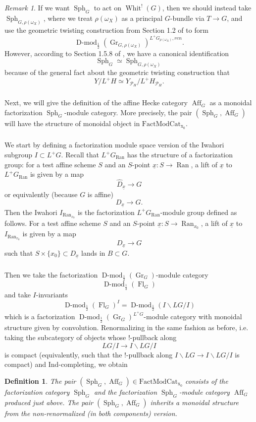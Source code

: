 \documentclass[10pt]{amsart}
\newtheorem{defn}[subsubsection]{Definition}
\theoremstyle{remark}
\newtheorem{rem}[subsubsection]{Remark}
\newcommand{\on}[1]{\operatorname{#1}}
\newcommand{\Dmodh}{\on{D-mod}_{\frac{1}{2}}}
\newcommand{\Ran}{\on{Ran}}
\newcommand{\FactModCat}{\on{FactModCat_{x_0}}}
\newcommand{\sssec}[1]{\subsubsection{}}
\begin{document}
\begin{rem}
    If we want $\on{Sph}_G$ to act on $\on{Whit}^!(G)$, then we should instead take $\on{Sph}_{G, \rho(\omega_X)}$, where we treat $\rho(\omega_X)$ as a principal $G$-bundle via $T \to G$, and use the geometric twisting construction from Section 1.2 of \cite{GLC2} to form
    $$
    \Dmodh(\on{Gr}_{G, \rho(\omega_X)})^{L^+G_{\rho(\omega_X)}, ren}.
    $$
    However, according to Section 1.5.8 of \cite{GLC2}, we have a canonical identification
    $$
    \on{Sph}_G \simeq \on{Sph}_{G, \rho(\omega_X)}
    $$
    because of the general fact about the geometric twisting construction that
    $$
    Y/L^+H \simeq Y_{\mathcal{P}_H}/L^+H_{\mathcal{P}_H}.
    $$
\end{rem}

\sssec{}
Next, we will give the definition of the affine Hecke category $\on{Aff}_G$ as a monoidal factorization $\on{Sph}_G$-module category. More precisely, the pair $(\on{Sph}_G, \on{Aff}_G)$ will have the structure of monoidal object in $\FactModCat$.

\sssec{}
We start by defining a factorization module space version of the Iwahori subgroup $I \subset L^+G$. Recall that $L^+G_{\Ran}$ has the structure of a factorization group: for a test affine scheme $S$ and an $S$-point $\underline{x}: S \to \Ran$, a lift of $\underline{x}$ to $L^+G_{\Ran}$ is given by a map
$$
\hat{D}_{\underline{x}} \to G 
$$
or equivalently (because $G$ is affine)
$$
D_{\underline{x}} \to G.
$$
Then the Iwahori $I_{\Ran_{x_0}}$ is the factorization $L^+G_{\Ran}$-module group defined as follows. For a test affine scheme $S$ and an $S$-point $\underline{x}: S \to \Ran_{x_0}$, a lift of $\underline{x}$ to $I_{\on{Ran}_{x_0}}$ is given by a map
$$
D_{\underline{x}} \to G
$$
such that $S \times \{x_0\} \subset D_{\underline{x}}$ lands in $B \subset G$.

\sssec{}
Then we take the factorization $\Dmodh(\on{Gr}_G)$-module category
$$
\Dmodh(\on{Fl}_G)
$$
and take $I$-invariants
$$
\Dmodh(\on{Fl}_G)^{I} = \Dmodh(I\backslash LG/I)
$$
which is a factorization $\Dmodh(\on{Gr}_G)^{L^+G}$-module category with monoidal structure given by convolution. Renormalizing in the same fashion as before, i.e. taking the subcategory of objects whose $!$-pullback along
$$
LG/I \to I\backslash LG/I
$$
is compact (equivalently, such that the $!$-pullback along $I\backslash LG \to I\backslash LG/I$ is compact) and Ind-completing, we obtain

\begin{defn}
    The pair $(\on{Sph}_G, \on{Aff}_G) \in \FactModCat$ consists of the factorization category $\on{Sph}_G$ and the factorization $\on{Sph}_G$-module category $\on{Aff}_G$ produced just above. The pair $(\on{Sph}_G, \on{Aff}_G)$ inherits a monoidal structure from the non-renormalized (in both components) version.
\end{defn}
\end{document}
